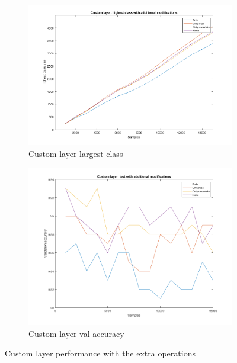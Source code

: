 \begin{figure}
    \centering
    \begin{subfigure}[b]{.49\textwidth}
        \centering
        \includegraphics[width=\textwidth]{figures/customhigh.png}
        \caption{Custom layer largest class}
        \label{sfig:ex:extra:customhigh}
    \end{subfigure}
    \hfill
    \begin{subfigure}[b]{.49\textwidth}
        \centering
        \includegraphics[width=\textwidth]{figures/customva.png}
        \caption{Custom layer val accuracy}
        \label{sfig:ex:extra:customva}
    \end{subfigure}
    \caption{Custom layer performance with the extra operations}
    \label{fig:ex:extra:custom}
\end{figure}

